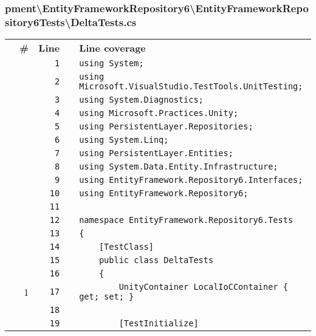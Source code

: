 \documentclass[a4paper,10pt]{article}
\begin{document}
\subsubsection{pment\textbackslash EntityFrameworkRepository6\textbackslash EntityFrameworkRepository6Tests\textbackslash DeltaTests.cs}
\begin{longtable}[l]{lrrll}
\textbf{} & \textbf{\#} & \textbf{Line} & \textbf{} & \textbf{Line coverage}\\
\cellcolor{gray} &  & \verb~1~ & & \verb~using System;~\\
\cellcolor{gray} &  & \verb~2~ & & \verb~using Microsoft.VisualStudio.TestTools.UnitTesting;~\\
\cellcolor{gray} &  & \verb~3~ & & \verb~using System.Diagnostics;~\\
\cellcolor{gray} &  & \verb~4~ & & \verb~using Microsoft.Practices.Unity;~\\
\cellcolor{gray} &  & \verb~5~ & & \verb~using PersistentLayer.Repositories;~\\
\cellcolor{gray} &  & \verb~6~ & & \verb~using System.Linq;~\\
\cellcolor{gray} &  & \verb~7~ & & \verb~using PersistentLayer.Entities;~\\
\cellcolor{gray} &  & \verb~8~ & & \verb~using System.Data.Entity.Infrastructure;~\\
\cellcolor{gray} &  & \verb~9~ & & \verb~using EntityFramework.Repository6.Interfaces;~\\
\cellcolor{gray} &  & \verb~10~ & & \verb~using EntityFramework.Repository6;~\\
\cellcolor{gray} &  & \verb~11~ & & \verb~~\\
\cellcolor{gray} &  & \verb~12~ & & \verb~namespace EntityFramework.Repository6.Tests~\\
\cellcolor{gray} &  & \verb~13~ & & \verb~{~\\
\cellcolor{gray} &  & \verb~14~ & & \verb~    [TestClass]~\\
\cellcolor{gray} &  & \verb~15~ & & \verb~    public class DeltaTests~\\
\cellcolor{gray} &  & \verb~16~ & & \verb~    {~\\
\cellcolor{green} & 1 & \verb~17~ & & \verb~        UnityContainer LocalIoCContainer { get; set; }~\\
\cellcolor{gray} &  & \verb~18~ & & \verb~~\\
\cellcolor{gray} &  & \verb~19~ & & \verb~        [TestInitialize]~\\

\end{longtable}
\end{document}
